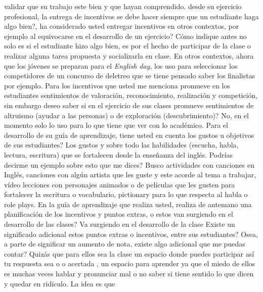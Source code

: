 \begin{dialogue}
	 validar que su trabajo este bien y que hayan comprendido.
	  desde su ejercicio profesional, la entrega de incentivos se debe hacer siempre que un 
	 estudiante haga algo bien?, ha considerado usted entregar incentivos en otros contextos, por ejemplo 
	 al equivocarse en el desarrollo de un ejercicio?
	  Cómo indique antes no solo es si el estudiante hizo algo bien, es por el 
	 hecho de participar de la clase o realizar alguna tarea propuesta y socializarla en clase. En otros 
	 contextos, ahora que los jóvenes se preparan para el \textit{English day}, los uso para seleccionar 
	 los competidores de un concurso de deletreo que se tiene pensado saber los finalistas por ejemplo.
	  Para los incentivos que usted me menciona promueve en los estudiantes sentimientos de 
	 valoración, reconocimiento, realización y competición, sin embargo deseo saber si en el ejercicio de 
	 sus clases promueve sentimientos de altruismo (ayudar a las personas) o de exploración 
	 (descubrimiento)?
	  No, en el momento solo lo uso para lo que tiene que ver con lo académico.
	  Para el desarrollo de su guía de aprendizaje, tiene usted en cuenta los gustos u 
	 objetivos de sus estudiantes?
	  Los gustos y sobre todo las  habilidades (escucha, habla, lectura, 
	 escritura) que se fortalecen desde la enseñanza del inglés.
	  Podrías decirme un ejemplo sobre esto que me dices?
	  Busco actividades con canciones en Inglés, canciones con algún artista que 
	 les guste y este acorde al tema a trabajar, vídeo lecciones con personajes animados o de películas 
	 que les gusten para fortalecer la escritura o vocabulario, pictionary para lo que respecta al habla o 
	 role plays.
	  En la guía de aprendizaje que realiza usted, realiza de antemano una planificación de 
	 los incentivos y puntos extras, o estos van surgiendo en el desarrollo de las clases?
	  Va surgiendo en el desarrollo de la clase
	  Existe un significado adicional estos puntos extras o incentivos, entre sus 
	 estudiantes? Osea, a parte de significar un aumento de nota, existe algo adicional que me puedas 
	 contar?
	  Quizás que para ellos sea la clase un espacio donde puedes participar así tu 
	 respuesta sea o  o acertada , un espacio para aprender ya que el miedo de ellos es muchas veces 
	 hablar y pronunciar mal o no saber si tiene sentido lo que dicen y quedar en ridículo. La idea es que 

\end{dialogue}
